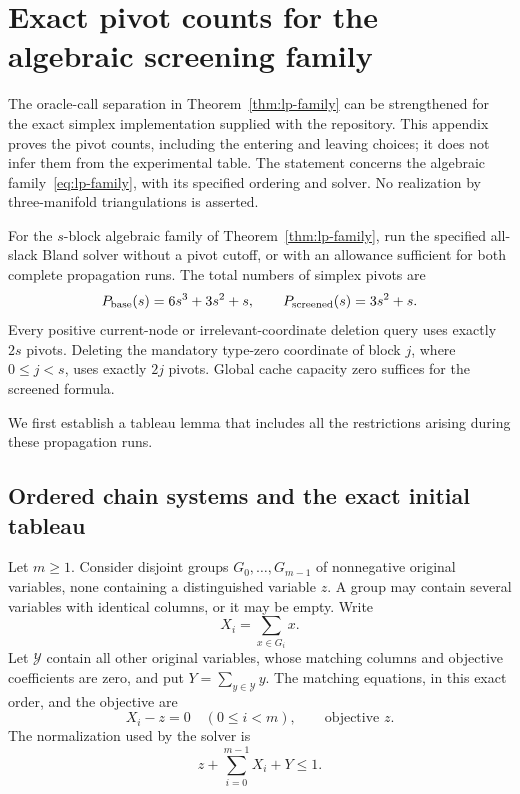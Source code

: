 \section{Exact pivot counts for the algebraic screening family}
\label{sec:pivot-appendix}

The oracle-call separation in Theorem~\ref{thm:lp-family} can be strengthened
for the exact simplex implementation supplied with the repository. This
appendix proves the pivot counts, including the entering and leaving choices;
it does not infer them from the experimental table. The statement concerns
the algebraic family~\eqref{eq:lp-family}, with its specified ordering and
solver. No realization by three-manifold triangulations is asserted.

\begin{theorem}\label{thm:lp-pivots}
For the $s$-block algebraic family of Theorem~\ref{thm:lp-family}, run the
specified all-slack Bland solver without a pivot cutoff, or with an allowance
sufficient for both complete propagation runs. The total numbers of simplex
pivots are
\begin{equation}\label{eq:lp-pivot-counts}
 P_{\rm base}(s)=6s^3+3s^2+s,
 \qquad
 P_{\rm screened}(s)=3s^2+s.
\end{equation}
Every positive current-node or irrelevant-coordinate deletion query uses
exactly $2s$ pivots. Deleting the mandatory type-zero coordinate of block
$j$, where $0\le j<s$, uses exactly $2j$ pivots. Global cache capacity zero
suffices for the screened formula.
\end{theorem}

We first establish a tableau lemma that includes all the restrictions
arising during these propagation runs.

\subsection{Ordered chain systems and the exact initial tableau}

Let $m\ge1$. Consider disjoint groups $G_0,\ldots,G_{m-1}$ of nonnegative
original variables, none containing a distinguished variable $z$. A group
may contain several variables with identical columns, or it may be empty.
Write
\[
 X_i=\sum_{x\in G_i}x.
\]
Let $\mathcal Y$ contain all other original variables, whose matching
columns and objective coefficients are zero, and put
$Y=\sum_{y\in\mathcal Y}y$. The matching equations, in this exact order,
and the objective are
\begin{equation}\label{eq:pivot-chain}
 X_i-z=0\quad(0\le i<m),\qquad \text{objective }z.
\end{equation}
The normalization used by the solver is
\begin{equation}\label{eq:pivot-normalization}
 z+\sum_{i=0}^{m-1}X_i+Y\le1.
\end{equation}

